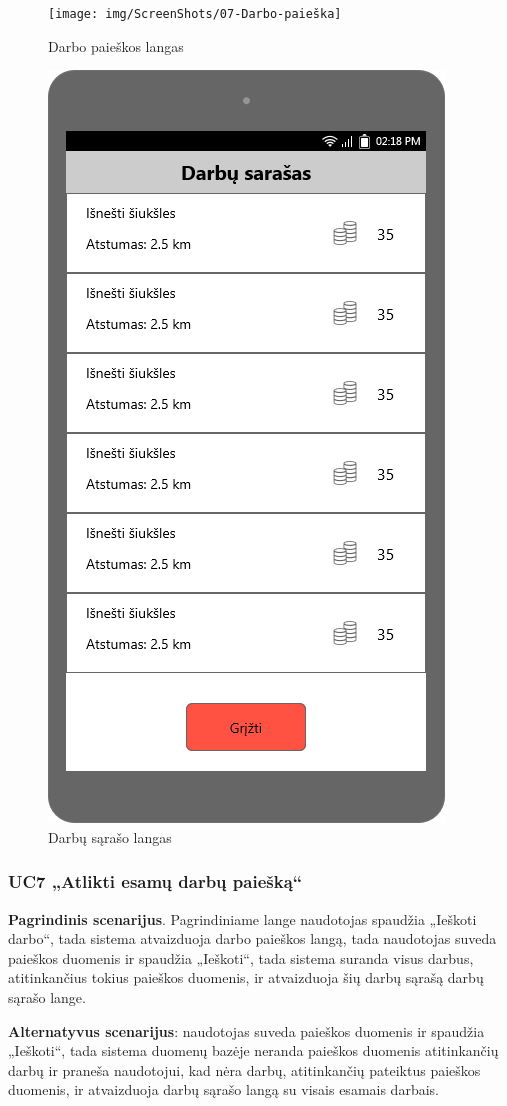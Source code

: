 \documentclass{VUMIFPSbakalaurinis}
\begin{document}
\begin{figure}[H]
	\centering
	\texttt{[image: img/ScreenShots/07-Darbo-paieška]}
	\caption{Darbo paieškos langas}
	\label{img:find work}
\end{figure}

\begin{figure}[H]
	\centering
	\includegraphics[scale=0.4]{img/ScreenShots/09-Darbų-sąrašas}
	\caption{Darbų sąrašo langas}
	\label{img:work list}
\end{figure}
\subsubsection{UC7 „Atlikti esamų darbų paiešką“}
\textbf{Pagrindinis scenarijus}. Pagrindiniame lange naudotojas spaudžia „Ieškoti darbo“, tada sistema atvaizduoja darbo paieškos langą, tada naudotojas suveda paieškos duomenis ir spaudžia „Ieškoti“, tada sistema suranda visus darbus, atitinkančius tokius paieškos duomenis, ir atvaizduoja šių darbų sąrašą darbų sąrašo lange. 
\par \textbf{Alternatyvus scenarijus}: naudotojas suveda paieškos duomenis ir spaudžia „Ieškoti“, tada sistema duomenų bazėje neranda paieškos duomenis atitinkančių darbų ir praneša naudotojui, kad nėra darbų, atitinkančių pateiktus paieškos duomenis, ir atvaizduoja darbų sąrašo langą su visais esamais darbais.
\end{document}
